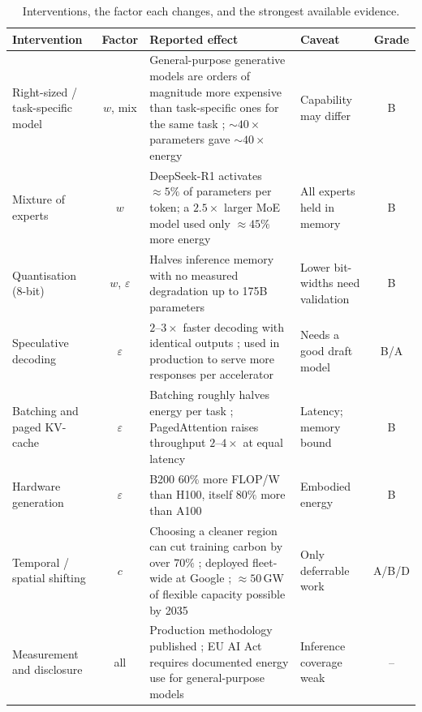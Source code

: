 \documentclass[11pt]{article}
\theoremstyle{definition}
\theoremstyle{remark}
\begin{document}
\begin{table}[h]
\centering
\small
\caption{Interventions, the factor each changes, and the strongest available evidence.}
\label{tab:levers}
\begin{tabularx}{\textwidth}{@{}p{2.6cm}cXXc@{}}
\toprule
Intervention & Factor & Reported effect & Caveat & Grade \\
\midrule
Right-sized / task-specific model & $w$, mix & General-purpose generative models are orders of magnitude more expensive than task-specific ones for the same task \citep{luccioni2024power}; $\sim\!40\times$ parameters gave $\sim\!40\times$ energy \citep{iea2025} & Capability may differ & B \\
Mixture of experts & $w$ & DeepSeek-R1 activates $\approx 5\%$ of parameters per token; a $2.5\times$ larger MoE model used only $\approx 45\%$ more energy \citep{iea2025} & All experts held in memory & B \\
Quantisation (8-bit) & $w$, $\varepsilon$ & Halves inference memory with no measured degradation up to 175B parameters \citep{dettmers2022} & Lower bit-widths need validation & B \\
Speculative decoding & $\varepsilon$ & $2$--$3\times$ faster decoding with identical outputs \citep{leviathan2023}; used in production to serve more responses per accelerator \citep{elsworth2025} & Needs a good draft model & B/A \\
Batching and paged KV-cache & $\varepsilon$ & Batching roughly halves energy per task \citep{iea2025}; PagedAttention raises throughput $2$--$4\times$ at equal latency \citep{kwon2023} & Latency; memory bound & B \\
Hardware generation & $\varepsilon$ & B200 $60\%$ more FLOP/W than H100, itself $80\%$ more than A100 \citep{iea2025} & Embodied energy & B \\
Temporal / spatial shifting & $c$ & Choosing a cleaner region can cut training carbon by over $70\%$ \citep{dodge2022}; deployed fleet-wide at Google \citep{radovanovic2023}; $\approx 50$\,GW of flexible capacity possible by 2035 \citep{iea2025} & Only deferrable work & A/B/D \\
Measurement and disclosure & all & Production methodology published \citep{elsworth2025}; EU AI Act requires documented energy use for general-purpose models \citep{euaiact} & Inference coverage weak & -- \\
\bottomrule
\end{tabularx}
\end{table}
\end{document}
